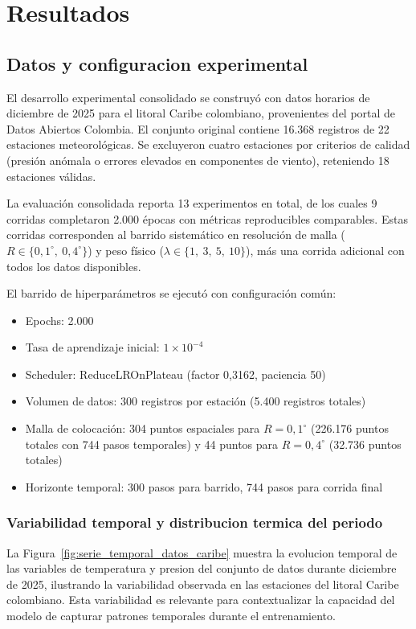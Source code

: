 \chapter{Resultados}

\section{Datos y configuracion experimental}

El desarrollo experimental consolidado se construyó con datos horarios de diciembre de 2025 para el litoral Caribe colombiano, provenientes del portal de Datos Abiertos Colombia. El conjunto original contiene 16.368 registros de 22 estaciones meteorológicas. Se excluyeron cuatro estaciones por criterios de calidad (presión anómala o errores elevados en componentes de viento), reteniendo 18 estaciones válidas.

La evaluación consolidada reporta 13 experimentos en total, de los cuales 9 corridas completaron 2.000 épocas con métricas reproducibles comparables. Estas corridas corresponden al barrido sistemático en resolución de malla ($R \in \{0{,}1^{\circ},\ 0{,}4^{\circ}\}$) y peso físico ($\lambda \in \{1,\ 3,\ 5,\ 10\}$), más una corrida adicional con todos los datos disponibles.

El barrido de hiperparámetros se ejecutó con configuración común:
\begin{itemize}
	\item Epochs: 2.000
	\item Tasa de aprendizaje inicial: $1 \times 10^{-4}$
	\item Scheduler: ReduceLROnPlateau (factor 0,3162, paciencia 50)
	\item Volumen de datos: 300 registros por estación (5.400 registros totales)
	\item Malla de colocación: 304 puntos espaciales para $R=0{,}1^{\circ}$ (226.176 puntos totales con 744 pasos temporales) y 44 puntos para $R=0{,}4^{\circ}$ (32.736 puntos totales)
	\item Horizonte temporal: 300 pasos para barrido, 744 pasos para corrida final
\end{itemize}

\subsection{Variabilidad temporal y distribucion termica del periodo}

La Figura~\ref{fig:serie_temporal_datos_caribe} muestra la evolucion temporal de las variables de temperatura y presion del conjunto de datos durante diciembre de 2025, ilustrando la variabilidad observada en las estaciones del litoral Caribe colombiano. Esta variabilidad es relevante para contextualizar la capacidad del modelo de capturar patrones temporales durante el entrenamiento.

